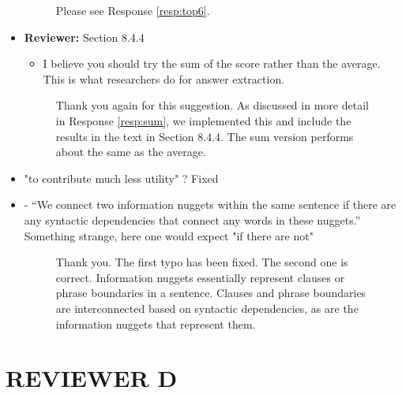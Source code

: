 \documentclass[10pt]{article}
\newcommand{\todo}[1]{\textcolor{red}{TODO: #1}}
\begin{document}
\begin{itemize}

\begin{figure}[H]
\caption{ Please see Response \ref{resp:top6}. }
\end{figure}

\item \textbf{Reviewer:} Section 8.4.4
\begin{itemize}
\item I believe you should try the sum of the score rather than the average.
This is what researchers do for answer extraction.
\end{itemize}

\begin{figure}[H]
\caption{Thank you again for this suggestion.  As discussed in more detail in Response \ref{resp:sum}, we implemented this and include the results in the text in Section 8.4.4.  The sum version performs about the same as the average.}
\end{figure}

\end{itemize}


\begin{itemize}
\item "to contribute much less utility" ? Fixed

\item - ``We connect two information nuggets within the same sentence if there
are any syntactic dependencies that connect any words in these nuggets.'' Something strange, here one would expect "if there are not"


\begin{figure}[H]
\caption{ Thank you.  The first typo has been fixed.  The second one is correct. Information nuggets essentially represent clauses or phrase boundaries in a sentence. Clauses and phrase boundaries are interconnected based on syntactic dependencies, as are the information nuggets that represent them. }
\end{figure}

\end{itemize}

\section{REVIEWER D}
\end{document}
